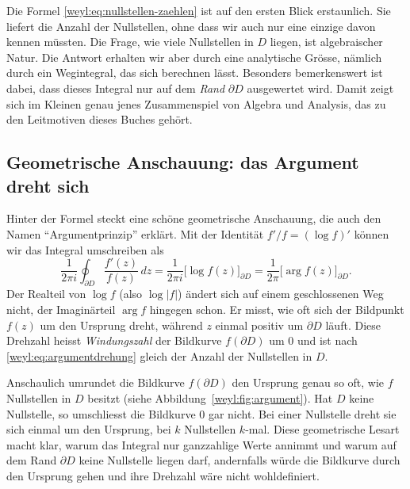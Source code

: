 Die Formel \eqref{weyl:eq:nullstellen-zaehlen} ist auf den ersten Blick erstaunlich.
Sie liefert die Anzahl der Nullstellen, ohne dass wir auch nur eine einzige davon kennen
müssten.
Die Frage, wie viele Nullstellen in $D$ liegen, ist algebraischer Natur.
Die Antwort erhalten wir aber durch eine analytische Grösse, nämlich durch ein
Wegintegral, das sich berechnen lässt.
Besonders bemerkenswert ist dabei, dass dieses Integral nur auf dem
\emph{Rand} $\partial D$ ausgewertet wird.
%
Damit zeigt sich im Kleinen genau jenes Zusammenspiel von Algebra und Analysis,
das zu den Leitmotiven dieses Buches gehört.

\subsection{Geometrische Anschauung: das Argument dreht sich%
\label{weyl:subsection:argument}}
Hinter der Formel steckt eine schöne geometrische Anschauung, die auch den Namen
``Argumentprinzip'' erklärt.
%
Mit der Identität $f'/f = (\log f)'$ können wir das Integral umschreiben als
\begin{equation}
\frac{1}{2\pi i}
\oint_{\partial D}
\frac{f'(z)}{f(z)}
\, dz
=
\frac{1}{2\pi i}
\bigl[\log f(z)\bigr]_{\partial D}
=
\frac{1}{2\pi}
\bigl[\arg f(z)\bigr]_{\partial D}
.
\label{weyl:eq:argumentdrehung}
\end{equation}
Der Realteil von $\log f$ (also $\log|f|$) ändert sich auf einem geschlossenen Weg
nicht, der Imaginärteil $\arg f$ hingegen schon. Er misst, wie oft sich der Bildpunkt
$f(z)$ um den Ursprung dreht, während $z$ einmal positiv um $\partial D$ läuft.
Diese Drehzahl heisst \emph{Windungszahl} der Bildkurve $f(\partial D)$ um $0$ und
ist nach \eqref{weyl:eq:argumentdrehung} gleich der Anzahl der Nullstellen in $D$.



Anschaulich umrundet die Bildkurve $f(\partial D)$ den Ursprung genau so oft, wie $f$
Nullstellen in $D$ besitzt (siehe Abbildung~\ref{weyl:fig:argument}).
Hat $D$ keine Nullstelle, so umschliesst die Bildkurve $0$ gar nicht. Bei einer
Nullstelle dreht sie sich einmal um den Ursprung, bei $k$ Nullstellen $k$-mal.
Diese geometrische Lesart macht klar, warum das Integral nur ganzzahlige Werte
annimmt und warum auf dem Rand $\partial D$ keine Nullstelle liegen darf, andernfalls
würde die Bildkurve durch den Ursprung gehen und ihre Drehzahl wäre nicht wohldefiniert.

